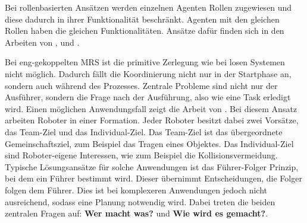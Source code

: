 Bei rollenbasierten Ansätzen werden einzelnen Agenten Rollen zugewiesen und diese dadurch in ihrer Funktionalität beschränkt. Agenten mit den gleichen Rollen haben die gleichen Funktionalitäten. Ansätze dafür finden sich in den Arbeiten von \cite{frias2005exploring}, \cite{vail2003multi} und \cite{stone1999task}.

Bei eng-gekoppelten MRS ist die primitive Zerlegung wie bei losen Systemen nicht möglich. Dadurch fällt die Koordinierung nicht nur in der Startphase an, sondern auch während des Prozesses. Zentrale Probleme sind nicht nur der Ausführer, sondern die Frage nach der Ausführung, also wie eine Task erledigt wird. Einen möglichen Anwendungsfall zeigt die Arbeit von \cite{saffiotti2000multi}. Bei diesem Ansatz arbeiten Roboter in einer Formation. Jeder Roboter besitzt dabei zwei Vorsätze, das Team-Ziel und das Individual-Ziel. Das Team-Ziel ist das übergeordnete Gemeinschaftsziel, zum Beispiel das Tragen eines Objektes. Das Individual-Ziel sind Roboter-eigene Interessen, wie zum Beispiel die Kollisionsvermeidung. Typische Lösungsansätze für solche Anwendungen ist das Führer-Folger Prinzip, bei dem ein Führer bestimmt wird. Dieser übernimmt Entscheidungen, die Folger folgen dem Führer. Dies ist bei komplexeren Anwendungen jedoch nicht ausreichend, sodass eine Planung notwendig wird. Dabei treten die beiden zentralen Fragen auf:\textbf{ Wer macht was?} und\textbf{ Wie wird es gemacht?}.

